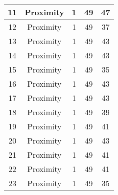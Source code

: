 \documentclass[results.tex]{subfiles}
\begin{document}
\begin{center}
\begin{tabular}{| c || c | c | c | c |}
            \hline
            11                      & Proximity                    & 1                      & 49                      & 47                   \\
            \hline
            12                      & Proximity                    & 1                      & 49                      & 37                   \\
            \hline
            13                      & Proximity                    & 1                      & 49                      & 43                   \\
            \hline
            14                      & Proximity                    & 1                      & 49                      & 43                   \\
            \hline
            15                      & Proximity                    & 1                      & 49                      & 35                   \\
            \hline
            16                      & Proximity                    & 1                      & 49                      & 43                   \\
            \hline
            17                      & Proximity                    & 1                      & 49                      & 43                   \\
            \hline
            18                      & Proximity                    & 1                      & 49                      & 39                   \\
            \hline
            19                      & Proximity                    & 1                      & 49                      & 41                   \\
            \hline
            20                      & Proximity                    & 1                      & 49                      & 43                   \\
            \hline
            21                      & Proximity                    & 1                      & 49                      & 41                   \\
            \hline
            22                      & Proximity                    & 1                      & 49                      & 41                   \\
            \hline
            23                      & Proximity                    & 1                      & 49                      & 35                   \\

\end{tabular}
\end{center}
\end{document}
